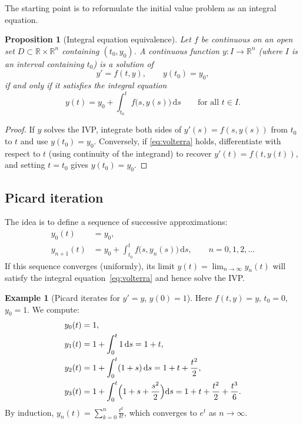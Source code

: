 \documentclass[12pt,a4paper,openany]{book}
\theoremstyle{definition}
\newtheorem{example}[definition]{Example}
\theoremstyle{plain}
\newtheorem{proposition}[definition]{Proposition}
\theoremstyle{remark}
\newcommand{\R}{\mathbb{R}}
\newcommand{\dd}{\mathrm{d}}
\begin{document}
The starting point is to reformulate the initial value problem as an integral
equation.

\begin{proposition}[Integral equation equivalence]\label{prop:integral-eq}
Let $f$ be continuous on an open set $D \subset \R \times \R^n$ containing
$(t_0, y_0)$. A continuous function $y\colon I \to \R^n$ (where $I$ is an
interval containing $t_0$) is a solution of
\[
  y' = f(t,y), \qquad y(t_0) = y_0,
\]
if and only if it satisfies the integral equation
\begin{equation}\label{eq:volterra}
  y(t) = y_0 + \int_{t_0}^{t} f\bigl(s, y(s)\bigr)\,\dd s
  \qquad \text{for all } t \in I.
\end{equation}
\end{proposition}

\begin{proof}
If $y$ solves the IVP, integrate both sides of $y'(s) = f(s,y(s))$ from $t_0$
to $t$ and use $y(t_0) = y_0$. Conversely, if \eqref{eq:volterra} holds,
differentiate with respect to $t$ (using continuity of the integrand) to
recover $y'(t) = f(t,y(t))$, and setting $t = t_0$ gives $y(t_0) = y_0$.
\end{proof}

\subsection{Picard iteration}\label{subsec:picard-iteration}

The idea is to define a sequence of successive approximations:
\begin{equation}\label{eq:picard-iterates}
\begin{aligned}
  y_0(t) &= y_0, \\
  y_{n+1}(t) &= y_0 + \int_{t_0}^{t} f\bigl(s, y_n(s)\bigr)\,\dd s,
  \qquad n = 0, 1, 2, \dotsc
\end{aligned}
\end{equation}
If this sequence converges (uniformly), its limit $y(t) = \lim_{n\to\infty} y_n(t)$
will satisfy the integral equation~\eqref{eq:volterra} and hence solve the IVP.

\begin{example}[Picard iterates for $y' = y$, $y(0)=1$]\label{ex:picard-exp}
Here $f(t,y) = y$, $t_0 = 0$, $y_0 = 1$. We compute:
\begin{align*}
  y_0(t) &= 1, \\
  y_1(t) &= 1 + \int_0^t 1\,\dd s = 1 + t, \\
  y_2(t) &= 1 + \int_0^t (1+s)\,\dd s = 1 + t + \frac{t^2}{2}, \\
  y_3(t) &= 1 + \int_0^t \Bigl(1 + s + \frac{s^2}{2}\Bigr)\dd s
           = 1 + t + \frac{t^2}{2} + \frac{t^3}{6}.
\end{align*}
By induction, $y_n(t) = \displaystyle\sum_{k=0}^{n} \frac{t^k}{k!}$, which
converges to $e^t$ as $n \to \infty$.
\end{example}
\end{document}
